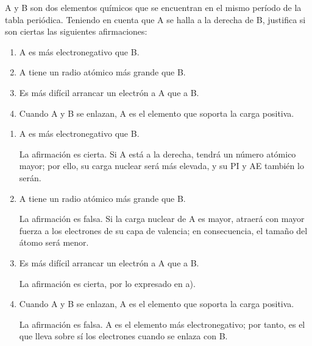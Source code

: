 \begin{question}
    A y B son dos elementos químicos que se encuentran
    en el mismo período de la tabla periódica. Teniendo en
    cuenta que A se halla a la derecha de B, justifica si son
    ciertas las siguientes afirmaciones:

    \begin{enumerate}[label=\letraminuscula]
    \item A es más electronegativo que B.
    \item A tiene un radio atómico más grande que B.
    \item Es más difícil arrancar un electrón a A que a B.
    \item Cuando A y B se enlazan, A es el elemento que soporta
    la carga positiva.
    \end{enumerate}


    \begin{solu}
        \begin{enumerate}[label=\letraminuscula]
            \item A es más electronegativo que B.

            La afirmación es cierta. Si A está a la derecha, tendrá un
            número atómico mayor; por ello, su carga nuclear será
            más elevada, y su PI y AE también lo serán.


            \item A tiene un radio atómico más grande que B.

            La afirmación es falsa. Si la carga nuclear de A es mayor,
            atraerá con mayor fuerza a los electrones de su capa de valencia; en consecuencia, el tamaño del átomo será
            menor.
            \item Es más difícil arrancar un electrón a A que a B.

            La afirmación es cierta, por lo expresado en a).

            \item Cuando A y B se enlazan, A es el elemento que soporta
            la carga positiva.

            La afirmación es falsa. A es el elemento más electronegativo;
            por tanto, es el que lleva sobre sí los electrones
            cuando se enlaza con B.
        \end{enumerate}
    \end{solu}

\end{question}

